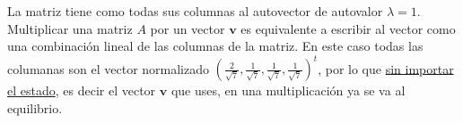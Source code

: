 \begin{enumerate}[label=(\alph*)]
        La matriz tiene como todas sus columnas al autovector de autovalor $\lambda = 1$. Multiplicar una matriz $A$ por un vector
        $\bm{v}$ es equivalente a escribir al vector como una combinación lineal de las columnas de la matriz. En este caso
        todas las columanas son el vector normalizado $(\frac{2}{\sqrt{7}},\frac{1}{\sqrt{7}},\frac{1}{\sqrt{7}},\frac{1}{\sqrt{7}})^t$,
        por lo que \underline{sin importar el estado}, es decir el vector $\bm{v}$ que uses, en una multiplicación ya
        se va al equilibrio.
\end{enumerate}

\begin{aportes}
  \item {}
\end{aportes}
